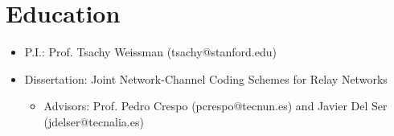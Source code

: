 \documentclass[11pt,a4paper,sans]{moderncv}        %
\begin{document}
\section{Education}




\begin{itemize}
  \item P.I.: Prof. Tsachy Weissman (tsachy@stanford.edu)
\end{itemize}


\vspace{10pt}
\begin{itemize}
 \item{Dissertation}: {Joint Network-Channel Coding Schemes for Relay Networks}
 \begin{itemize}
  \item Advisors: Prof. Pedro Crespo (pcrespo@tecnun.es) and Javier Del Ser (jdelser@tecnalia.es)
\end{itemize}
\end{itemize}
\end{document}
